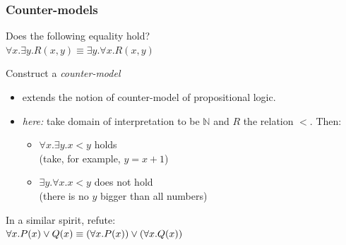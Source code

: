 \documentclass{beamer}
\begin{document}
\begin{frame}[fragile]\frametitle{Counter-models}


  Does the following equality hold?\\
  $\forall x. \exists y. R(x,y) \equiv \exists y. \forall x. R(x,y)$


  \pause
  \vspace{3mm}
   Construct a \emph{counter-model} 
  \begin{itemize}
  \item extends the notion of counter-model of propositional logic.
  \item \emph{here:} take domain of interpretation to be $\mathbb{N}$ and $R$
    the relation $<$. Then:
    \begin{itemize}
    \item $\forall x. \exists y. x < y$ holds\\
      (take, for example, $y = x + 1$)
    \item $\exists y. \forall x. x < y$ does not hold\\
      (there is no $y$ bigger than all numbers)
    \end{itemize}
  \end{itemize}

  \vspace{3mm}
  In a similar spirit, refute:\\
  $\forall x. P(x) \vee Q(x) \equiv (\forall x. P(x)) \vee (\forall x. Q(x))$
\end{frame}
\end{document}
